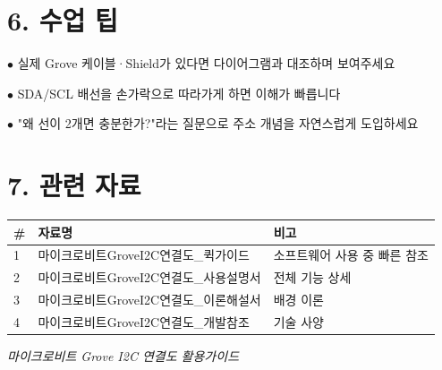 \documentclass[11pt,a4paper]{article}
\begin{document}
\section*{6. 수업 팁}

$\bullet$  실제 Grove 케이블·Shield가 있다면 다이어그램과 대조하며 보여주세요

$\bullet$  SDA/SCL 배선을 손가락으로 따라가게 하면 이해가 빠릅니다

$\bullet$  "왜 선이 2개면 충분한가?"라는 질문으로 주소 개념을 자연스럽게 도입하세요



\section*{7. 관련 자료}

\begin{center}
\renewcommand{\arraystretch}{1.4}
\begin{tabular}{|p{1.5cm}|p{7.3cm}|p{6.2cm}|}
\hline
\rowcolor{tableheader}
\textbf{\#} & \textbf{자료명} & \textbf{비고} \\
\hline
1 & 마이크로비트GroveI2C연결도\_퀵가이드 & 소프트웨어 사용 중 빠른 참조 \\
\hline
2 & 마이크로비트GroveI2C연결도\_사용설명서 & 전체 기능 상세 \\
\hline
3 & 마이크로비트GroveI2C연결도\_이론해설서 & 배경 이론 \\
\hline
4 & 마이크로비트GroveI2C연결도\_개발참조 & 기술 사양 \\
\hline
\end{tabular}
\end{center}


\vfill
\begin{center}
\small\color{lightbrown}
\textit{마이크로비트 Grove I2C 연결도 활용가이드}
\end{center}
\end{document}
